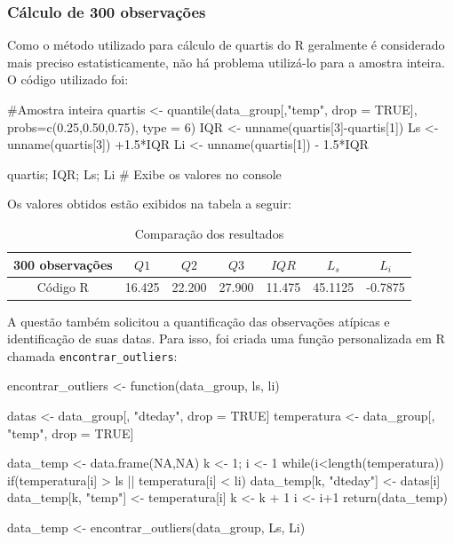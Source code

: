 \documentclass[a4paper, 12pt, titlepage]{article}
\begin{document}
\subsubsection*{Cálculo de 300 observações}

Como o método utilizado para cálculo de quartis do R geralmente é considerado mais preciso estatisticamente, não há problema utilizá-lo para a amostra inteira. O código utilizado foi:

\begin{rcode}[firstnumber=56, caption={Cálculo das 300 observações (2)},breaklines=true, breakatwhitespace=true]
    #Amostra inteira
    quartis <- quantile(data_group[,"temp", drop = TRUE], probs=c(0.25,0.50,0.75), type = 6)
    IQR <- unname(quartis[3]-quartis[1])  
    Ls <- unname(quartis[3]) +1.5*IQR
    Li <- unname(quartis[1]) - 1.5*IQR

    quartis; IQR; Ls; Li # Exibe os valores no console
\end{rcode}

Os valores obtidos estão exibidos na tabela a seguir:
\vspace*{-2mm}
\begin{table}[h!]
    \centering
    \caption{Comparação dos resultados}
    \label{tab:mascara_6u}
    \begin{tabular}{c|c|c|c|c|c|c}
        300 observações& $Q1$ & $Q2$ & $Q3$ & $IQR$ & $L_s$ & $L_i$ \\\hline
        Código R &16.425 &22.200 &27.900 &11.475 & 45.1125 &-0.7875 \\ 
    \end{tabular}
\end{table}

A questão também solicitou a quantificação das observações atípicas e identificação de suas datas. Para isso, foi criada uma função personalizada em R chamada \texttt{encontrar\_outliers}:

\begin{rcode}[firstnumber=64, caption={Determinação de outliers},breaklines=true, breakatwhitespace=true]
    encontrar_outliers <- function(data_group, ls, li){
      datas <- data_group[, "dteday", drop = TRUE]
      temperatura <- data_group[, "temp", drop = TRUE]
    
      data_temp <- data.frame(NA,NA)
      k <- 1; i <- 1
      while(i<length(temperatura)){
        if(temperatura[i] > ls || temperatura[i] < li){
          data_temp[k, "dteday"] <- datas[i]
          data_temp[k, "temp"]   <- temperatura[i]
          k <- k + 1
        }
      i <- i+1  
      }
      return(data_temp)
    }
    data_temp <- encontrar_outliers(data_group, Ls, Li)
\end{rcode}
\end{document}
